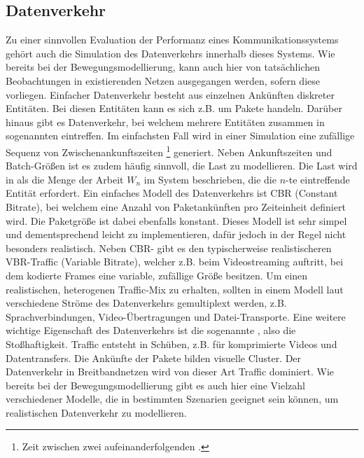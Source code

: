 \documentclass[12pt, a4paper]{article}
\begin{document}
\subsection{Datenverkehr}
\label{sec:traffic}

Zu einer sinnvollen Evaluation der Performanz eines Kommunikationssystems gehört auch die Simulation des Datenverkehrs
innerhalb dieses Systems. Wie bereits bei der Bewegungsmodellierung, kann auch hier von tatsächlichen Beobachtungen in
existierenden Netzen ausgegangen werden, sofern diese vorliegen.
\newline\newline
Einfacher Datenverkehr besteht aus einzelnen Ankünften diskreter Entitäten.
Bei diesen Entitäten kann es sich z.B. um Pakete handeln. Darüber hinaus gibt es Datenverkehr, 
bei welchem mehrere Entitäten zusammen in sogenannten  eintreffen.
Im einfachsten Fall wird in einer Simulation eine zufällige Sequenz von Zwischenankunftszeiten \footnote{Zeit zwischen zwei 
aufeinanderfolgenden .} generiert. Neben Ankunftszeiten und Batch-Größen ist es zudem häufig sinnvoll,
die Last zu modellieren. \cite{Frost1994} Die Last wird in \cite{Frost1994} als die Menge der Arbeit $W_n$ im System beschrieben,
die die $n$-te eintreffende Entität erfordert.
\newline\newline
Ein einfaches Modell des Datenverkehrs ist \textsc{CBR} (Constant Bitrate), bei welchem eine Anzahl von Paketankünften
pro Zeiteinheit definiert wird. Die Paketgröße ist dabei ebenfalls konstant. Dieses Modell ist sehr simpel und dementsprechend
leicht zu implementieren, dafür jedoch in der Regel nicht besonders realistisch.\newline
Neben \textsc{CBR}- gibt es den typischerweise realistischeren \textsc{VBR}-Traffic (Variable Bitrate), 
welcher z.B. beim Videostreaming auftritt, bei dem kodierte Frames eine variable, zufällige Größe besitzen.\cite{Frost1994}
Um einen realistischen, heterogenen Traffic-Mix zu erhalten, sollten in einem Modell laut \cite{Frost1994} verschiedene
Ströme des Datenverkehrs gemultiplext werden, z.B. Sprachverbindungen, Video-Übertragungen und Datei-Transporte.
\newline\newline
Eine weitere wichtige Eigenschaft des Datenverkehrs ist die sogenannte , also die Stoßhaftigkeit.
Traffic entsteht in Schüben, z.B. für komprimierte Videos und Datentransfers. Die Ankünfte der Pakete bilden visuelle
Cluster. Der Datenverkehr in Breitbandnetzen wird von dieser Art Traffic dominiert. \cite{Frost1994}
\newline\newline
Wie bereits bei der Bewegungsmodellierung gibt es auch hier eine Vielzahl verschiedener Modelle, die in bestimmten Szenarien
geeignet sein können, um realistischen Datenverkehr zu modellieren.
\end{document}
